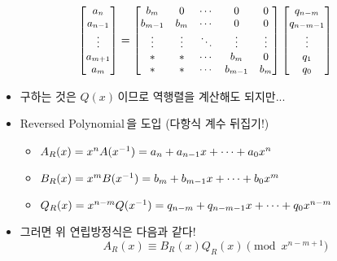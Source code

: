 \begin{frame}
    \[\small
        \begin{bmatrix}
            a_n \\ a_{n - 1} \\ \vdots \\ a_{m + 1} \\ a_m
        \end{bmatrix} = \begin{bmatrix}
            b_m       & 0      & \cdots & 0         & 0      \\
            b_{m - 1} & b_m    & \cdots & 0         & 0      \\
            \vdots    & \vdots & \ddots & \vdots    & \vdots \\
            \ast      & \ast   & \cdots & b_m       & 0      \\
            \ast      & \ast   & \cdots & b_{m - 1} & b_m
        \end{bmatrix} \begin{bmatrix}
            q_{n - m} \\ q_{n - m - 1} \\ \vdots \\ q_1 \\ q_0
        \end{bmatrix}
    \]
    \begin{itemize}
        \setlength{\itemsep}{0.8em}
        \item 구하는 것은 \(Q(x)\)\,이므로 역행렬을 계산해도 되지만...
        \item<2-> Reversed Polynomial\,을 도입 (다항식 계수 뒤집기!)
              \begin{itemize}
                  \item \(A_R(x) = x^n A(x^{-1}) = a_n + a_{n - 1} x + \cdots + a_0 x^n\)
                  \item \(B_R(x) = x^m B(x^{-1}) = b_m + b_{m - 1} x + \cdots + b_0 x^m\)
                  \item \(Q_R(x) = x^{n - m} Q(x^{-1}) = q_{n - m} + q_{n - m - 1} x + \cdots + q_0 x^{n - m}\)
              \end{itemize} \pause
        \item<4-> 그러면 위 연립방정식은 다음과 같다!
              \[
                  A_R(x) \equiv B_R(x) Q_R(x) \pmod{x^{n - m + 1}}
              \]
    \end{itemize}
\end{frame}

